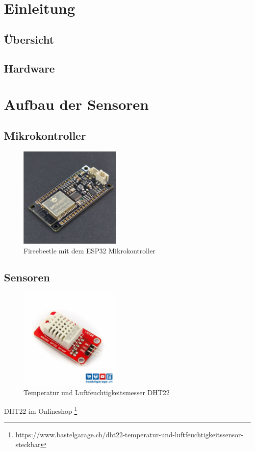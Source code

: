 \documentclass[
  10pt, %
  a4paper, %
  twoside, %
  openright, %
  numbers=noenddot, %
  BCOR=5mm, %
  parskip=half*, %
  thesis, %
]{bfhbook}
\begin{document}
\chapter{Einleitung}
\section{Übersicht}
\section{Hardware}
\chapter{Aufbau der Sensoren}
\section{Mikrokontroller}
\begin{figure}[htp]
  \begin{center}
    \includegraphics[width=5cm, left]{Bilder/Firebeetle.jpg}
  \end{center}
    \caption{Fireebeetle mit dem ESP32 Mikrokontroller}
  \label{fig:test1}
\end{figure}

 \section{Sensoren}
 \begin{figure}[htp]
  \begin{center}
    \includegraphics[width=5cm, left]{Bilder/DHT22.jpg}
  \end{center}
    \caption{Temperatur und Luftfeuchtigkeitsmesser DHT22}
  \label{fig:dht22}
\end{figure}
DHT22 im Onlineshop \footnote{https://www.bastelgarage.ch/dht22-temperatur-und-luftfeuchtigkeitssensor-steckbar}
\end{document}
